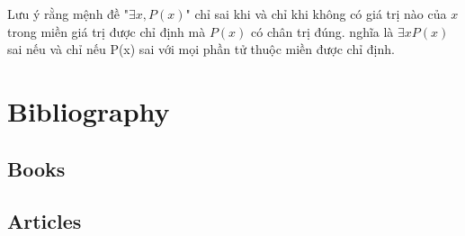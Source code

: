 \documentclass[11pt,fleqn]{book} %
\begin{document}
        Lưu ý rằng mệnh đề "$\exists x, P(x)$" chỉ sai khi và chỉ khi không có giá trị nào của $x$ trong miền giá trị được chỉ định mà $P(x)$ có chân trị đúng. nghĩa là $\exists x P(x)$ sai nếu và chỉ nếu P(x) sai với mọi phần tử thuộc miền được chỉ định.
        
        
        

\chapter*{Bibliography}
\section*{Books}
\printbibliography[heading=bibempty,type=book]
\section*{Articles}
\printbibliography[heading=bibempty,type=article]


\cleardoublepage
{}
\setlength{\columnsep}{0.75cm}
\printindex

\end{document}
